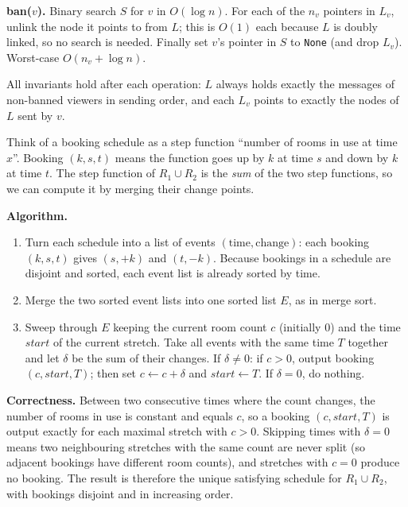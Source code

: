 \documentclass[12pt,twoside]{article}
\begin{document}
\begin{problems}
\textbf{ban($v$).} Binary search $S$ for $v$ in $O(\log n)$. For each of the $n_v$ pointers in
$L_v$, unlink the node it points to from $L$; this is $O(1)$ each because $L$ is doubly linked,
so no search is needed. Finally set $v$'s pointer in $S$ to \texttt{None} (and drop $L_v$).
Worst-case $O(n_v+\log n)$.

All invariants hold after each operation: $L$ always holds exactly the messages of non-banned
viewers in sending order, and each $L_v$ points to exactly the nodes of $L$ sent by $v$.

\newpage
\problem  %

\begin{problemparts}
\problempart %
Think of a booking schedule as a step function ``number of rooms in use at time $x$''. Booking
$(k,s,t)$ means the function goes up by $k$ at time $s$ and down by $k$ at time $t$. The step
function of $R_1\cup R_2$ is the \emph{sum} of the two step functions, so we can compute it by
merging their change points.

\textbf{Algorithm.}
\begin{enumerate}
\item Turn each schedule into a list of events $(\text{time},\text{change})$: each booking
$(k,s,t)$ gives $(s,+k)$ and $(t,-k)$. Because bookings in a schedule are disjoint and sorted,
each event list is already sorted by time.
\item Merge the two sorted event lists into one sorted list $E$, as in merge sort.
\item Sweep through $E$ keeping the current room count $c$ (initially $0$) and the time
$\mathit{start}$ of the current stretch. Take all events with the same time $T$ together and let
$\delta$ be the sum of their changes. If $\delta\neq 0$: if $c>0$, output booking
$(c,\mathit{start},T)$; then set $c\gets c+\delta$ and $\mathit{start}\gets T$.
If $\delta=0$, do nothing.
\end{enumerate}

\textbf{Correctness.} Between two consecutive times where the count changes, the number of rooms in
use is constant and equals $c$, so a booking $(c,\mathit{start},T)$ is output exactly for each
maximal stretch with $c>0$. Skipping times with $\delta=0$ means two neighbouring stretches with the
same count are never split (so adjacent bookings have different room counts), and stretches with
$c=0$ produce no booking. The result is therefore the unique satisfying schedule for
$R_1\cup R_2$, with bookings disjoint and in increasing order.


\end{problemparts}
\end{problems}
\end{document}
